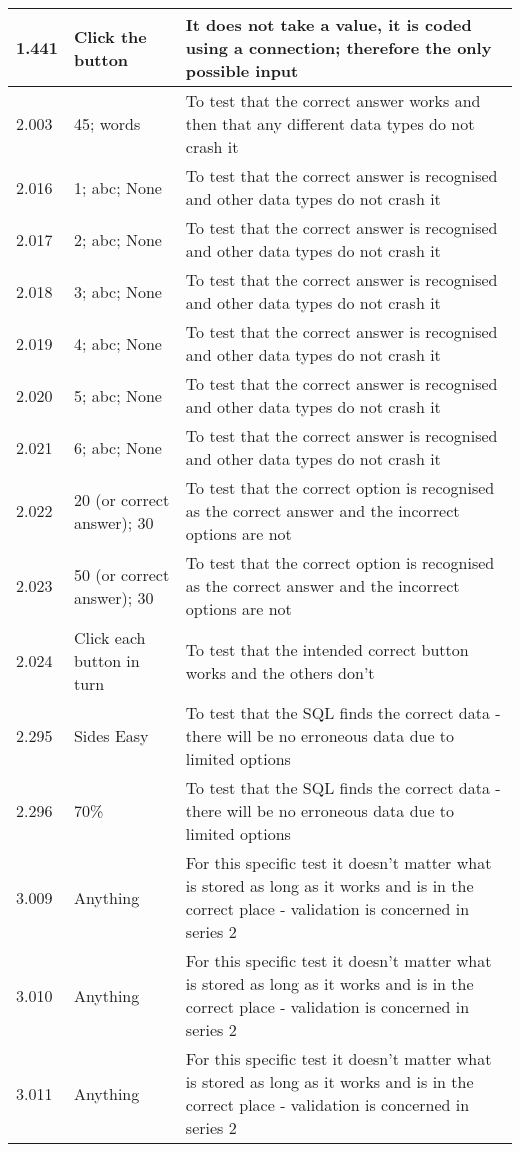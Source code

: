 \begin{landscape}
\begin{center}
\begin{longtable}{|p{4cm}|p{4cm}|p{5cm}|}
1.441 & Click the button & It does not take a value, it is coded using a connection; therefore the only possible input \\ \hline
2.003 & 45; words & To test that the correct answer works and then that any different data types do not crash it \\ \hline
2.016 & 1; abc; None & To test that the correct answer is recognised and other data types do not crash it \\ \hline
2.017 & 2; abc; None & To test that the correct answer is recognised and other data types do not crash it \\ \hline 
2.018 & 3; abc; None & To test that the correct answer is recognised and other data types do not crash it \\ \hline
2.019 & 4; abc; None & To test that the correct answer is recognised and other data types do not crash it \\ \hline
2.020 & 5; abc; None & To test that the correct answer is recognised and other data types do not crash it \\ \hline
2.021 & 6; abc; None & To test that the correct answer is recognised and other data types do not crash it \\ \hline
2.022 & 20 (or correct answer); 30 & To test that the correct option is recognised as the correct answer and the incorrect options are not \\ \hline
2.023 & 50 (or correct answer); 30 & To test that the correct option is recognised as the correct answer and the incorrect options are not \\ \hline
2.024 & Click each button in turn & To test that the intended correct button works and the others don't \\ \hline
2.295 & Sides Easy & To test that the SQL finds the correct data - there will be no erroneous data due to limited options \\ \hline
2.296 & 70\% & To test that the SQL finds the correct data - there will be no erroneous data due to limited options \\ \hline
3.009 & Anything & For this specific test it doesn't matter what is stored as long as it works and is in the correct place - validation is concerned in series 2 \\ \hline
3.010 & Anything & For this specific test it doesn't matter what is stored as long as it works and is in the correct place - validation is concerned in series 2 \\ \hline
3.011 & Anything & For this specific test it doesn't matter what is stored as long as it works and is in the correct place - validation is concerned in series 2 \\ \hline

\end{longtable}
\end{center}
\end{landscape}
